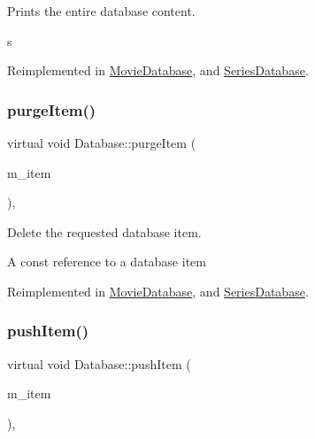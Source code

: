 Prints the entire database content. 

s 

Reimplemented in \hyperlink{classMovieDatabase_af1e13b6fc0fd7186e98edbe2cf187618}{Movie\+Database}, and \hyperlink{classSeriesDatabase_ae2bf5323216e0043292494d3f0ac978c}{Series\+Database}.

\mbox{\label{classDatabase_a8f47437526eeec631f1328fab9bbbc75}} 
\subsubsection{\texorpdfstring{purge\+Item()}{purgeItem()}}
{\footnotesize\ttfamily virtual void Database\+::purge\+Item (\begin{DoxyParamCaption}\item[{\hyperlink{classDatabaseItem}{Database\+Item}}]{m\+\_\+item }\end{DoxyParamCaption})\hspace{0.3cm}{\ttfamily [inline]}, {\ttfamily [virtual]}}



Delete the requested database item. 

A const reference to a database item

Reimplemented in \hyperlink{classMovieDatabase_ad3ce59d0fa7f64937085e7504bd3b85a}{Movie\+Database}, and \hyperlink{classSeriesDatabase_a863a35987b5a4de15a121b8b4358e353}{Series\+Database}.

\mbox{\label{classDatabase_a80fa14ab9f4deadc9a2ab7493f1919a4}} 
\subsubsection{\texorpdfstring{push\+Item()}{pushItem()}}
{\footnotesize\ttfamily virtual void Database\+::push\+Item (\begin{DoxyParamCaption}\item[{const \hyperlink{classDatabaseItem}{Database\+Item} \&}]{m\+\_\+item }\end{DoxyParamCaption})\hspace{0.3cm}{\ttfamily [inline]}, {\ttfamily [virtual]}}



